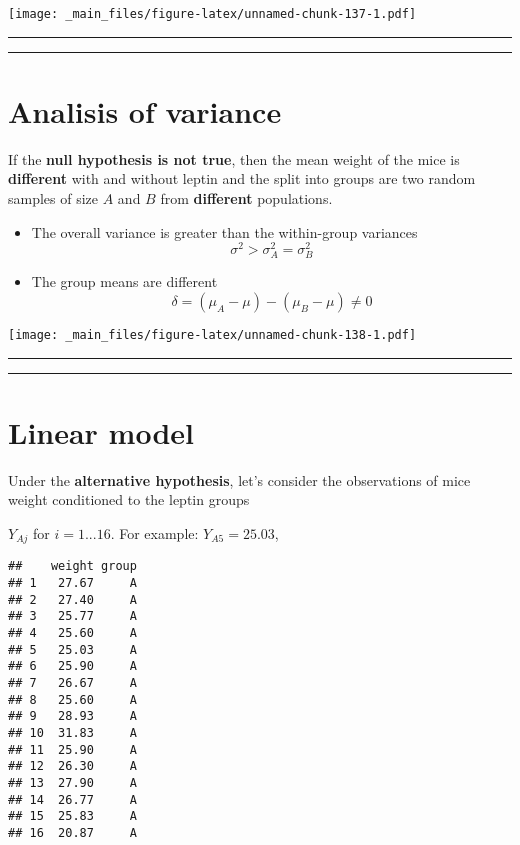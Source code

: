 \documentclass[
]{book}
\begin{document}
\texttt{[image: \_main\_files/figure-latex/unnamed-chunk-137-1.pdf]}

\begin{center}\rule{0.5\linewidth}{0.5pt}\end{center}

\begin{center}\rule{0.5\linewidth}{0.5pt}\end{center}

\hypertarget{analisis-of-variance-1}{%
\section{Analisis of variance}\label{analisis-of-variance-1}}

If the \textbf{null hypothesis is not true}, then the mean weight of the mice is \textbf{different} with and without leptin and the split into groups are two random samples of size \(A\) and \(B\) from \textbf{different} populations.

\begin{itemize}
\item
  The overall variance is greater than the within-group variances \[\sigma^2> \sigma^2_A=\sigma^2_B\]
\item
  The group means are different \[\delta=(\mu_A-\mu)-(\mu_B-\mu)\neq 0\]
\end{itemize}

\texttt{[image: \_main\_files/figure-latex/unnamed-chunk-138-1.pdf]}

\begin{center}\rule{0.5\linewidth}{0.5pt}\end{center}

\begin{center}\rule{0.5\linewidth}{0.5pt}\end{center}

\hypertarget{linear-model}{%
\section{Linear model}\label{linear-model}}

Under the \textbf{alternative hypothesis}, let's consider the observations of mice weight conditioned to the leptin groups

\(Y_{Aj}\) for \(i=1...16\). For example: \(Y_{A5}=25.03\),

\begin{verbatim}
##    weight group
## 1   27.67     A
## 2   27.40     A
## 3   25.77     A
## 4   25.60     A
## 5   25.03     A
## 6   25.90     A
## 7   26.67     A
## 8   25.60     A
## 9   28.93     A
## 10  31.83     A
## 11  25.90     A
## 12  26.30     A
## 13  27.90     A
## 14  26.77     A
## 15  25.83     A
## 16  20.87     A
\end{verbatim}
\end{document}
